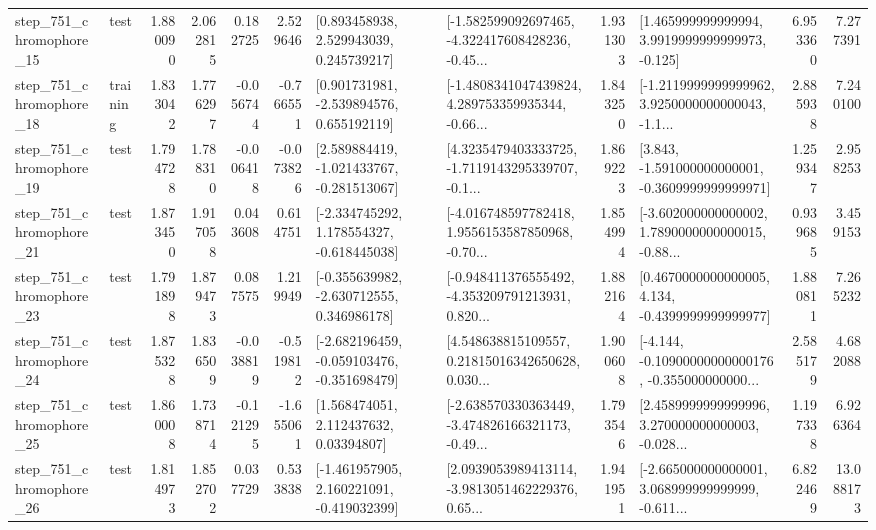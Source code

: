 \begin{tabular}{llrrrrllrlrr}
  step\_751\_chromophore\_15 &      test &      1.880090 &    2.062815 &      0.182725 &  2.529646 &     [0.893458938, 2.529943039, 0.245739217] &  [-1.582599092697465, -4.322417608428236, -0.45... &       1.931303 &    [1.465999999999994, 3.9919999999999973, -0.125] &            6.953360 &          7.277391 \\
  step\_751\_chromophore\_18 &  training &      1.833042 &    1.776297 &     -0.056744 & -0.766551 &    [0.901731981, -2.539894576, 0.655192119] &  [-1.4808341047439824, 4.289753359935344, -0.66... &       1.843250 &  [-1.2119999999999962, 3.9250000000000043, -1.1... &            2.885938 &          7.240100 \\
  step\_751\_chromophore\_19 &      test &      1.794728 &    1.788310 &     -0.006418 & -0.073826 &   [2.589884419, -1.021433767, -0.281513067] &  [4.3235479403333725, -1.7119143295339707, -0.1... &       1.869223 &   [3.843, -1.591000000000001, -0.3609999999999971] &            1.259347 &          2.958253 \\
  step\_751\_chromophore\_21 &      test &      1.873450 &    1.917058 &      0.043608 &  0.614751 &   [-2.334745292, 1.178554327, -0.618445038] &  [-4.016748597782418, 1.9556153587850968, -0.70... &       1.854994 &  [-3.602000000000002, 1.7890000000000015, -0.88... &            0.939685 &          3.459153 \\
  step\_751\_chromophore\_23 &      test &      1.791898 &    1.879473 &      0.087575 &  1.219949 &   [-0.355639982, -2.630712555, 0.346986178] &  [-0.948411376555492, -4.353209791213931, 0.820... &       1.882164 &   [0.4670000000000005, 4.134, -0.4399999999999977] &            1.880811 &          7.265232 \\
  step\_751\_chromophore\_24 &      test &      1.875328 &    1.836509 &     -0.038819 & -0.519812 &  [-2.682196459, -0.059103476, -0.351698479] &  [4.548638815109557, 0.21815016342650628, 0.030... &       1.900608 &  [-4.144, -0.10900000000000176, -0.355000000000... &            2.585179 &          4.682088 \\
  step\_751\_chromophore\_25 &      test &      1.860008 &    1.738714 &     -0.121295 & -1.655061 &      [1.568474051, 2.112437632, 0.03394807] &  [-2.638570330363449, -3.474826166321173, -0.49... &       1.793546 &  [2.4589999999999996, 3.270000000000003, -0.028... &            1.197338 &          6.926364 \\
  step\_751\_chromophore\_26 &      test &      1.814973 &    1.852702 &      0.037729 &  0.533838 &   [-1.461957905, 2.160221091, -0.419032399] &  [2.0939053989413114, -3.9813051462229376, 0.65... &       1.941951 &  [-2.665000000000001, 3.068999999999999, -0.611... &            6.822469 &         13.088173 \\

\end{tabular}
